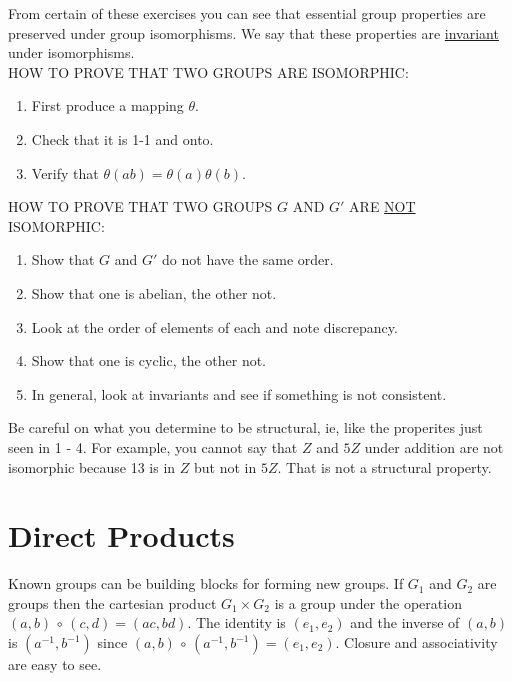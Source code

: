 \documentclass[12pt]{book}
\theoremstyle{definition}
\begin{document}
From certain of these exercises you can see that essential group properties are preserved under group isomorphisms.  We say that these properties are \underline{invariant} under isomorphisms. \\[.1in]
HOW TO PROVE THAT TWO GROUPS ARE ISOMORPHIC:
\begin{enumerate}
\item First produce a mapping $\theta$.
\item Check that it is 1-1 and onto.
\item Verify that $\theta(ab)=\theta(a)\theta(b)$.
\end{enumerate}
%
HOW TO PROVE THAT TWO GROUPS $G$ AND $G'$ ARE \underline{NOT} ISOMORPHIC:
\begin{enumerate}
\item Show that $G$ and $G'$ do not have the same order.
\item Show that one is abelian, the other not.
\item Look at the order of elements of each and note discrepancy.
\item Show that one is cyclic, the other not.
\item In general, look at invariants and see if something is not consistent.
\end{enumerate}

Be careful on what you determine to be structural, ie, like the properites just seen in 1 - 4.  For example, you cannot say that $Z$ and $5Z$ under addition are not isomorphic because 13 is in $Z$ but not in $5Z$.  That is not a structural property.

\section{Direct Products}
Known groups can be building blocks for forming new groups.  If $G_1$ and $G_2$ are groups then the cartesian product $G_1 \times G_2$ is a group under the operation $(a,b)\,\circ\,(c,d)=(ac,bd)$.  The identity is $(e_1,e_2)$ and the inverse of $(a,b)$ is $(a^{-1},b^{-1})$ since $(a,b)\,\circ\,(a^{-1},b^{-1})=(e_1,e_2)$.  Closure and associativity are easy to see.
\end{document}
